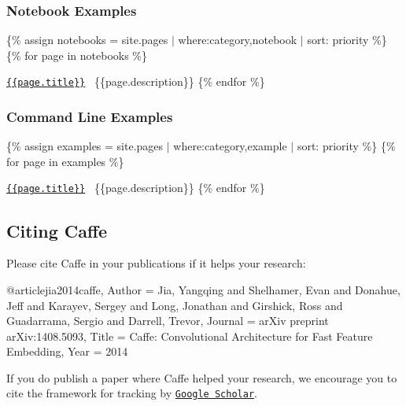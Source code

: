 \subsubsection*{Notebook Examples}

\{\% assign notebooks = site.\+pages $\vert$ where\+:\textquotesingle{}category\textquotesingle{},\textquotesingle{}notebook\textquotesingle{} $\vert$ sort\+: \textquotesingle{}priority\textquotesingle{} \%\} \{\% for page in notebooks \%\}
\begin{DoxyItemize}
\item \href{http://nbviewer.ipython.org/github/BVLC/caffe/blob/master/{{page.original_path}}}{\tt \{\{page.\+title\}\}}~\newline
\{\{page.\+description\}\} \{\% endfor \%\}
\end{DoxyItemize}

\subsubsection*{Command Line Examples}

\{\% assign examples = site.\+pages $\vert$ where\+:\textquotesingle{}category\textquotesingle{},\textquotesingle{}example\textquotesingle{} $\vert$ sort\+: \textquotesingle{}priority\textquotesingle{} \%\} \{\% for page in examples \%\}
\begin{DoxyItemize}
\item \href{{{page.url}}}{\tt \{\{page.\+title\}\}}~\newline
\{\{page.\+description\}\} \{\% endfor \%\}
\end{DoxyItemize}

\subsection*{Citing Caffe}

Please cite Caffe in your publications if it helps your research\+: \begin{DoxyVerb}@article{jia2014caffe,
  Author = {Jia, Yangqing and Shelhamer, Evan and Donahue, Jeff and Karayev, Sergey and Long, Jonathan and Girshick, Ross and Guadarrama, Sergio and Darrell, Trevor},
  Journal = {arXiv preprint arXiv:1408.5093},
  Title = {Caffe: Convolutional Architecture for Fast Feature Embedding},
  Year = {2014}
}
\end{DoxyVerb}


If you do publish a paper where Caffe helped your research, we encourage you to cite the framework for tracking by \href{https://scholar.google.com/citations?view_op=view_citation&hl=en&citation_for_view=-ltRSM0AAAAJ:u5HHmVD_uO8C}{\tt Google Scholar}.

